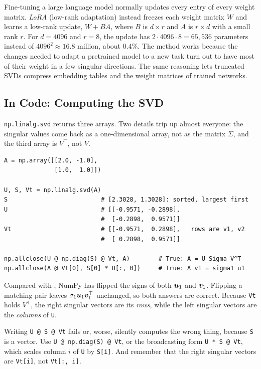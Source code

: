 \begin{aibox}
  Fine-tuning a large language model normally updates every entry of
  every weight matrix. \emph{LoRA} (low-rank adaptation) instead freezes
  each weight matrix $W$ and learns a low-rank update, $W + BA$, where $B$
  is $d \times r$ and $A$ is $r \times d$ with a small rank $r$. For
  $d = 4096$ and $r = 8$, the update has $2 \cdot 4096 \cdot 8 = 65{,}536$
  parameters instead of $4096^2 \approx 16.8$ million, about $0.4\%$. The
  method works because the changes needed to adapt a pretrained model to
  a new task turn out to have most of their weight in a few singular
  directions. The same reasoning lets truncated SVDs compress embedding
  tables and the weight matrices of trained networks.
\end{aibox}

\subsection{In Code: Computing the SVD}
\label{sec:ch04-svd-code}

\texttt{np.linalg.svd} returns three arrays. Two details trip up almost
everyone: the singular values come back as a one-dimensional array, not
as the matrix $\Sigma$, and the third array is $V^\top$, not $V$.

\begin{lstlisting}
A = np.array([[2.0, -1.0],
              [1.0,  1.0]])

U, S, Vt = np.linalg.svd(A)
S                          # [2.3028, 1.3028]: sorted, largest first
U                          # [[-0.9571, -0.2898],
                           #  [-0.2898,  0.9571]]
Vt                         # [[-0.9571,  0.2898],   rows are v1, v2
                           #  [ 0.2898,  0.9571]]

np.allclose(U @ np.diag(S) @ Vt, A)        # True: A = U Sigma V^T
np.allclose(A @ Vt[0], S[0] * U[:, 0])     # True: A v1 = sigma1 u1
\end{lstlisting}

Compared with , NumPy has flipped the signs of both
$\bm{u}_1$ and $\bm{v}_1$. Flipping a matching pair leaves
$\sigma_1 \bm{u}_1 \bm{v}_1^\top$ unchanged, so both answers are
correct. Because \texttt{Vt} holds $V^\top$, the right singular vectors
are its \emph{rows}, while the left singular vectors are the
\emph{columns} of \texttt{U}.

\begin{warning}
  Writing \texttt{U @ S @ Vt} fails or, worse, silently computes the wrong
  thing, because \texttt{S} is a vector. Use \texttt{U @ np.diag(S) @ Vt},
  or the broadcasting form \texttt{U * S @ Vt}, which scales column $i$ of
  \texttt{U} by \texttt{S[i]}. And remember that the right singular
  vectors are \texttt{Vt[i]}, not \texttt{Vt[:, i]}.
\end{warning}

